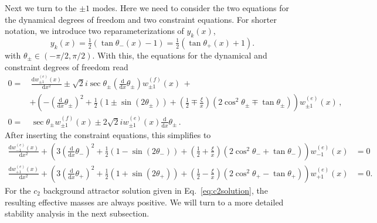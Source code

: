 Next we turn to the $\pm 1$ modes. Here we need to consider the two equations for the dynamical degrees of freedom and two constraint equations. For shorter notation, we introduce two reparameterizations of $y_k(x)$, 
\begin{equation}
y_k(x)=\tfrac{1}{2}\left(\tan\theta_{-}(x)-1\right)=\tfrac{1}{2}\left(\tan\theta_{+}(x)+1\right).
\end{equation}
with $\theta_\pm \in (- \pi/2, \pi/2)$. With this, the equations for the dynamical and constraint degrees of freedom read
\begin{align}
0 = & \, \frac{\textrm{d} w^{(e)}_{\pm1}(x)}{\textrm{d}x^2} \pm \sqrt{2}  i \sec \theta_{\pm}\left( \tfrac{\textrm{d}}{\textrm{d}x}\theta_{\pm}\right) w^{(f)}_{\pm1}(x) \,  + \nonumber \\
& +\left(-\left(\tfrac{\textrm{d}}{\textrm{d}x}\theta_{\pm}\right)^{2}+\tfrac{1}{2}\left(1\pm\sin(2\theta_{\pm})\right)+\left(\frac{1}{2}\mp\frac{\xi}{x}\right)\left(2\cos^{2}\theta_{\pm}\mp\tan\theta_{\pm}\right)\right) w^{(e)}_{\pm1}(x) \,, \nonumber \\
0 = & \, \sec \theta_{\pm} w^{(f)}_{\pm1}(x) \pm 2 \sqrt{2}  i w^{(e)}_{\pm1}(x) \tfrac{\textrm{d}}{\textrm{d}x}\theta_{\pm}  \,.
\end{align}
After inserting the constraint equations, this simplifies to
\begin{align}
 \frac{\textrm{d} w^{(e)}_{-1}(x)}{\textrm{d}x^2}+\left(3\left(\tfrac{\textrm{d}}{\textrm{d}x}\theta_{-}\right)^{2}+\tfrac{1}{2}\left(1-\sin(2\theta_{-})\right)+\left(\frac{1}{2}+\frac{\xi}{x}\right)\left(2\cos^{2}\theta_{-}+\tan\theta_{-}\right)\right)w^{(e)}_{-1}(x) & =0 \nonumber \\
  \frac{\textrm{d} w^{(e)}_{+1}(x)}{\textrm{d}x^2}+\left(3\left(\tfrac{\textrm{d}}{\textrm{d}x}\theta_{+}\right)^{2}+\tfrac{1}{2}\left(1+\sin(2\theta_{+})\right)+\left(\frac{1}{2}-\frac{\xi}{x}\right)\left(2\cos^{2}\theta_{+}-\tan\theta_{+}\right)\right) w^{(e)}_{+1}(x) & =0.
  \label{eq:pm1mode}
\end{align}
For the $c_2$ background attractor solution given in Eq.~\eqref{eq:c2solution}, the resulting effective masses are always positive. We will turn to a more detailed stability analysis in the next subsection. 


